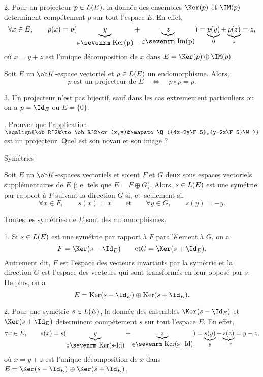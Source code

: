 \Remarque{} 2. Pour un projecteur $p\in\sc L(E)$, la donn\'ee des ensembles $\Ker(p)$ et $\IM(p)$ determinent comp\'etement $p$ sur tout l'espace $E$. En effet, 
$$
\forall x\in E, \qquad p(x)=p(\underbrace{y}_{\in\mbox{\sevenrm Ker(p)}}+\underbrace{z}_{\in\mbox{\sevenrm Im(p)}})=\underbrace{p(y)}_0+\underbrace{p(z)}_{z}=z,
$$
o\`u $x=y+z$ est l'unique d\'ecomposition de $x$ dans $E=\Ker(p)\oplus\IM(p)$. 
\bigskip

\Propriete []  Soit $E$ un $\ob K$-espace vectoriel et $p\in\sc L(E)$ un endomorphisme. Alors, 
$$
{p\mbox{ est un projecteur de }E\quad \Longleftrightarrow\quad p\circ p=p}.
$$

\Remarque{} 3. Un projecteur n'est pas bijectif, sauf dans les cas extremement particuliers ou on a $p=\Id_E$ ou $E=\{0\}$. 
\bigskip

\Exercice. Prouver que l'application $\eqalign{\ob R^2&\to \ob R^2\cr (x,y)&\mapsto  \Q({4x-2y\F5},{y-2x\F5}\W)}$ est un projecteur. Quel est son noyau et son image ?
\bigskip

\Concept [] Sym\'etries 

\noindent
Soit $E$ un $\ob K$-espaces vectoriels et soient $F$ et $G$ deux sous espaces vectoriels sup\-pl\'e\-men\-tai\-res de $E$ (i.e. tels que $E=F\oplus G$). 
Alors, $s\in\sc L(E)$ est une sym\'etrie par rapport \`a $F$ suivant la direction $G$ si, et~seulement si, 
$$
\forall x\in F ,\qquad  s(x)=x \qquad\mbox{et}\qquad\forall y\in G , \qquad  s(y)=-y .
$$

\Propriete []  Toutes les sym\'etries de $E$ sont des automorphismes.
\bigskip

\Remarque{} 1. Si $s\in\sc L(E)$ est une sym\'etrie par rapport \`a $F$ parall\`element \`a $G$, on a 
$$
F=\Ker(s-\Id_E) \qquad\mbox{et}  G=\Ker(s+\Id_E) . 
$$
Autrement dit, $F$ est l'espace des vecteurs invariants par la sym\'etrie et la direction $G$ est l'espace des vecteurs qui sont transform\'es en leur oppos\'e par $s$. De plus, on a 
$$
{E=\mbox{Ker}(s-\Id_E)\oplus\mbox{Ker}(s+\Id_E)}.
$$

\Remarque{} 2. Pour une sym\'etrie $s\in\sc L(E)$, la donn\'ee des ensembles $\Ker(s-\Id_E)$ et $\Ker(s+\Id_E)$ determinent comp\'etement $s$ sur tout l'espace $E$. En effet, 
$$
\forall x\in E, \qquad s(x)=s(\underbrace{y}_{\in\mbox{\sevenrm Ker(s-Id)}}+\underbrace{z}_{\in\mbox{\sevenrm Ker(s+Id)}})=\underbrace{s(y)}_y+\underbrace{s(z)}_{-z}=y-z,
$$
o\`u $x=y+z$ est l'unique d\'ecomposition de $x$ dans $E=\Ker(s-\Id_E)\oplus\Ker(s+\Id_E)$. 
\bigskip

